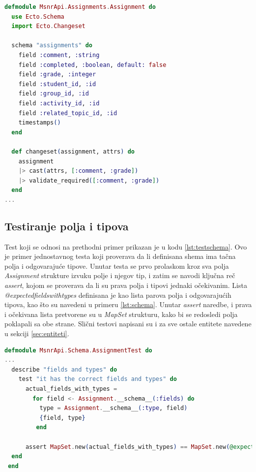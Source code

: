 \documentclass[12pt,oneside]{memoir}
\begin{document}
\begin{lstlisting}[language=elixir, caption={Shema tabele assignments},captionpos=b, label={lst:schema}]
defmodule MsnrApi.Assignments.Assignment do
  use Ecto.Schema
  import Ecto.Changeset

  schema "assignments" do
    field :comment, :string
    field :completed, :boolean, default: false
    field :grade, :integer
    field :student_id, :id
    field :group_id, :id
    field :activity_id, :id
    field :related_topic_id, :id
    timestamps()
  end

  def changeset(assignment, attrs) do
    assignment
    |> cast(attrs, [:comment, :grade])
    |> validate_required([:comment, :grade])
  end
...
\end{lstlisting}

\subsection{Testiranje polja i tipova}
\par Test koji se odnosi na prethodni primer prikazan je u kodu \ref{lst:testschema}. Ovo je primer jednostavnog testa koji proverava da li definisana shema ima tačna polja i odgovarajuće tipove. Unutar testa se prvo prolaskom kroz sva polja \emph{Assignment} strukture izvuku polje i njegov tip, i zatim se navodi ključna reč \emph{assert}, kojom se proverava da li su prava polja i tipovi jednaki očekivanim. Lista \emph{@expected{\textunderscore}fields{\textunderscore}with{\textunderscore}types} definisana je kao lista parova polja i odgovarajućih tipova, kao što su navedeni u primeru \ref{lst:schema}. Unutar \emph{assert} naredbe, i prava i očekivana lista pretvorene su u \emph{MapSet} strukturu, kako bi se redosledi polja poklapali sa obe strane. Slični testovi napisani su i za sve ostale entitete navedene u sekciji \ref{sec:entiteti}.

\begin{lstlisting}[language=elixir, caption={Test za proveru polja i tipova tabele \emph{assignments}},captionpos=b, label={lst:testschema}]
defmodule MsnrApi.Schema.AssignmentTest do
...  
  describe "fields and types" do
    test "it has the correct fields and types" do
      actual_fields_with_types =
        for field <- Assignment.__schema__(:fields) do
          type = Assignment.__schema__(:type, field)
          {field, type}
         end
    
      assert MapSet.new(actual_fields_with_types) == MapSet.new(@expected_fields_with_types)
  end
 end
\end{lstlisting}
\end{document}
